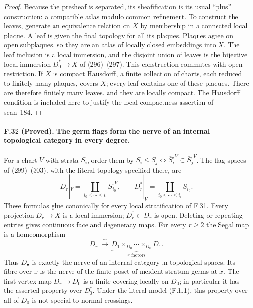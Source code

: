 \begin{proof}
Because the presheaf is separated, its sheafification is its usual
``plus'' construction: a compatible atlas modulo common refinement.
To construct the leaves, generate an equivalence relation on $X$ by
membership in a connected local plaque. A leaf is given the final
topology for all its plaques. Plaques agree on open subplaques, so they
are an atlas of locally closed embeddings into $X$. The leaf inclusion
is a local immersion, and the disjoint union of leaves is the bijective
local immersion $D_0^*\to X$ of (296)--(297). This construction commutes
with open restriction. If $X$ is compact Hausdorff, a finite collection
of charts, each reduced to finitely many plaques, covers $X$; every leaf
contains one of these plaques. There are therefore finitely many leaves,
and they are locally compact. The Hausdorff condition is included here
to justify the local compactness assertion of scan~184.
\end{proof}

\paragraph{F.32 (Proved). The germ flags form the nerve of an internal
topological category in every degree.}
For a chart $V$ with strata $S_i$, order them by
$S_i\leq S_j\iff\overline S_i^{,V}\subset\overline S_j^{,V}$.
The flag spaces of (299)--(303), with the literal topology specified
there, are
\[
 D_r|_V=
 \coprod_{i_0\leq\cdots\leq i_r}\overline S_{i_0}^{,V},
 \qquad
 D_r^*|_V=
 \coprod_{i_0\leq\cdots\leq i_r}S_{i_0}.
 \tag{F.h.1}
\]
These formulas glue canonically for every local stratification of F.31.
Every projection $D_r\to X$ is a local immersion; $D_r^*\subset D_r$
is open. Deleting or repeating entries gives continuous face and
degeneracy maps. For every $r\geq2$ the Segal map is a homeomorphism
\[
 D_r\ \xrightarrow{\ \sim\ }\
 \underbrace{D_1\times_{D_0}\cdots\times_{D_0}D_1}_{r\text{ factors}}.
 \tag{F.h.2}
\]
Thus $D_\bullet$ is exactly the nerve of an internal category in
topological spaces. Its fibre over $x$ is the nerve of the finite poset
of incident stratum germs at $x$. The first-vertex map $D_r\to D_0$ is
a finite covering locally on $D_0$; in particular it has the asserted
property over $D_0^*$. Under the literal model (F.h.1), this property
over all of $D_0$ is not special to normal crossings.

